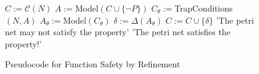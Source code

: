 \begin{figure}[t]
  \begin{algorithmic}[1]
    \State $C := \mathcal C(N)$
    \State $A := $Model$(C \cup \{\neg P\})$
    \State $C_\theta := $TrapConditions$(N, A)$
    \State $A_\theta := $Model$(C_\theta)$
    \State $\delta := \Delta(A_\theta)$
    \State $C := C \cup \{\delta\}$
    \Else
    \State \Return 'The petri net may not satisfy the property'
    \EndIf
    \EndWhile
    \State \Return 'The petri net satisfies the property!'
  \end{algorithmic}
  \caption{Pseudocode for Function Safety by Refinement}
  \label{fig_function_safety_by_refinement_pseudocode}
\end{figure}



